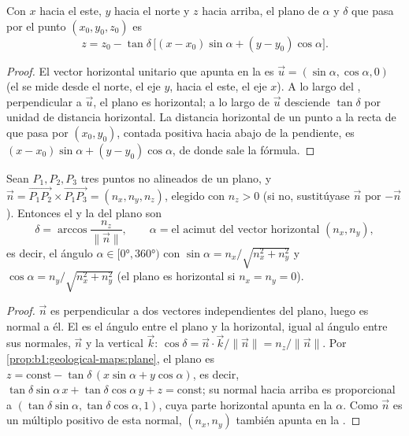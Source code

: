 \begin{proposition}\label{prop:b1:geological-maps:plane}
Con $x$ hacia el este, $y$ hacia el norte y $z$ hacia arriba, el plano de 
$\alpha$ y  $\delta$ que pasa por el punto $(x_0, y_0, z_0)$ es
\[
  z = z_0 - \tan\delta\,\bigl[(x - x_0)\sin\alpha + (y - y_0)\cos\alpha\bigr].
\]
\end{proposition}

\begin{proof}
El vector horizontal unitario que apunta en la  es
$\vec u = (\sin\alpha, \cos\alpha, 0)$ (el  se mide desde el norte, el eje $y$, hacia el
este, el eje $x$). A lo largo del , perpendicular a $\vec u$, el plano es horizontal; a lo
largo de $\vec u$ desciende $\tan\delta$ por unidad de distancia horizontal. La distancia horizontal
de un punto a la recta de  que pasa por $(x_0, y_0)$, contada positiva hacia abajo de la
pendiente, es $(x-x_0)\sin\alpha + (y-y_0)\cos\alpha$, de donde sale la fórmula.
\end{proof}

\begin{theorem}\label{thm:b1:geological-maps:three-point}
Sean $P_1, P_2, P_3$ tres puntos no alineados de un plano, y
$\vec n = \overrightarrow{P_1P_2} \times \overrightarrow{P_1P_3} =
(n_x, n_y, n_z)$, elegido con $n_z > 0$ (si no, sustitúyase $\vec n$ por $-\vec n$). Entonces el
 y la  del plano son
\[
  \delta = \arccos\frac{n_z}{\|\vec n\|}, \qquad
  \alpha = \text{el acimut del vector horizontal } (n_x, n_y),
\]
es decir, el ángulo $\alpha \in [\ang{0}, \ang{360})$ con
$\sin\alpha = n_x/\sqrt{n_x^2+n_y^2}$ y $\cos\alpha = n_y/\sqrt{n_x^2+n_y^2}$
(el plano es horizontal si $n_x = n_y = 0$).
\end{theorem}

\begin{proof}
$\vec n$ es perpendicular a dos vectores independientes del plano, luego es normal a él. El
 es el ángulo entre el plano y la horizontal, igual al ángulo entre sus normales, $\vec n$
y la vertical $\vec k$: $\cos\delta = \vec n \cdot \vec k / \|\vec n\| = n_z/\|\vec n\|$.
Por \cref{prop:b1:geological-maps:plane}, el plano es $z = \text{const} -
\tan\delta\,(x\sin\alpha + y\cos\alpha)$, es decir,
$\tan\delta\sin\alpha\,x + \tan\delta\cos\alpha\,y + z = \text{const}$; su normal hacia arriba es
proporcional a $(\tan\delta\sin\alpha,
\tan\delta\cos\alpha, 1)$, cuya parte horizontal apunta en la 
$\alpha$. Como $\vec n$ es un múltiplo positivo de esta normal, $(n_x, n_y)$ también apunta en la
.
\end{proof}

